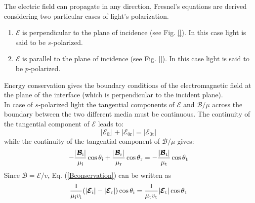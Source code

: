 The electric field can propagate in any direction, Fresnel's equations are derived considering two particular cases of light's polarization. 
\begin{enumerate}
\item $\boldsymbol{\mathcal{E}}$ is perpendicular to the plane of incidence (see Fig. \ref{}). In this case  light is said to be $s$-polarized.
\item $\boldsymbol{\mathcal{E}}$ is parallel to the plane of incidence (see Fig. \ref{}). In this case light is said to be $p$-polarized.
\end{enumerate}
Energy conservation gives the boundary conditions of the electromagnetic field at the plane of the interface (which is perpendicular to the incident plane). \\ 
\indent In case of $s$-polarized light the tangential components of $\boldsymbol{\mathcal{E}}$ and $\boldsymbol{\mathcal{B}}/\mu$ across the boundary between the two different media must be continuous. The continuity of the tangential component of $\boldsymbol{\mathcal{E}}$ leads to:
\begin{equation}\label{Econservation}
|\boldsymbol{\mathcal{E}}_{0\textrm{i}}|+|\boldsymbol{\mathcal{E}}_{0\textrm{r}}|= |\boldsymbol{\mathcal{E}}_{0\textrm{t}}|
\end{equation} 
while the continuity of the tangential component of $\boldsymbol{\mathcal{B}}/\mu$ gives:
\begin{equation}\label{Bconservation}
-\frac{|\boldsymbol{\mathcal{B}}_{\textrm{i}}|}{\mu_\textrm{i}}\cos\mbox{$\theta$}_{\textrm{i}}+\frac{|\boldsymbol{\mathcal{B}}_{\textrm{r}}|}{\mu_\textrm{r}}\cos\mbox{$\theta$}_{\textrm{r}} = 
-\frac{|\boldsymbol{\mathcal{B}}_{\textrm{t}}|}{\mu_\textrm{t}}\cos\mbox{$\theta$}_{\textrm{t}}
\end{equation}
Since $\boldsymbol{\mathcal{B}} = \boldsymbol{\mathcal{E}}/v$, Eq. (\ref{Bconservation}) can be written as 
\begin{equation}
\frac{1}{\mu_{\textrm{i}}v_{\textrm{i}}}(|\boldsymbol{\mathcal{E}}_{\textrm{i}}|-|\boldsymbol{\mathcal{E}}_{\textrm{r}}|)\cos\mbox{$\theta$}_{\textrm{i}} = \frac{1}{\mu_{\textrm{t}}v_{\textrm{t}}}|\boldsymbol{\mathcal{E}}_{\textrm{t}}|\cos\mbox{$\theta$}_{\textrm{t}}
\end{equation}
